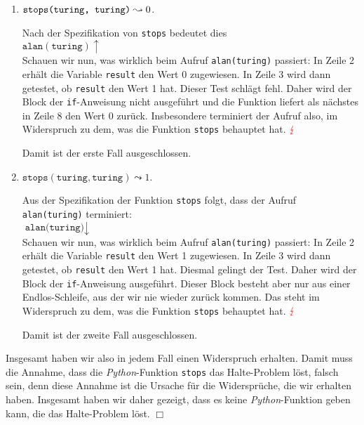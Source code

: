 \begin{enumerate}
\item $\texttt{stops(\texttt{turing}, \texttt{turing})} \leadsto 0$. 

      Nach der Spezifikation von \texttt{stops} bedeutet dies \\[0.1cm]
      \hspace*{1.3cm} $\texttt{alan}(\texttt{turing}) \uparrow$ \\[0.1cm]
      Schauen wir nun, was wirklich beim Aufruf \texttt{alan(turing)} passiert:
      In Zeile 2 erhält die Variable \texttt{result} den Wert 0 zugewiesen.  In Zeile 3
      wird dann getestet, ob \texttt{result} den Wert 1 hat.  Dieser Test schlägt fehl.
      Daher wird der Block der \texttt{if}-Anweisung nicht ausgeführt und die Funktion liefert als
      nächstes in Zeile 8 den Wert 0 zurück.  Insbesondere terminiert der Aufruf also, im
      Widerspruch zu dem, was die Funktion \texttt{stops} behauptet hat. ${\color{red}\lightning}$

      Damit ist der erste Fall ausgeschlossen.
\item  $\texttt{stops}(\texttt{turing}, \texttt{turing}) \leadsto 1$. 

      Aus der Spezifikation der Funktion \texttt{stops} folgt, dass der Aufruf
      \texttt{alan(turing)} terminiert: \\[0.1cm]
      \hspace*{1.3cm} $\texttt{alan(turing)} \downarrow$ \\[0.1cm]
      Schauen wir nun, was wirklich beim Aufruf \texttt{alan(turing)} passiert:
      In Zeile 2 erhält die Variable \texttt{result} den Wert 1 zugewiesen.  In Zeile 3
      wird dann getestet, ob \texttt{result} den Wert 1 hat.  Diesmal gelingt der Test.
      Daher wird der Block der \texttt{if}-Anweisung ausgeführt.  Dieser Block
      besteht aber nur aus einer Endlos-Schleife, aus der wir nie wieder zurück kommen.
      Das steht im Widerspruch zu dem, was die Funktion \texttt{stops} behauptet hat.
      ${\color{red}\lightning}$

      Damit ist der zweite Fall ausgeschlossen.
\end{enumerate}
Insgesamt haben wir also in jedem Fall einen Widerspruch erhalten.  
Damit muss die Annahme, dass die \textsl{Python}-Funktion \texttt{stops}
das Halte-Problem löst, falsch sein, denn diese Annahme ist die Ursache für die Widersprüche, die
wir erhalten haben.  Insgesamt haben wir daher gezeigt, dass es keine \textsl{Python}-Funktion
geben kann, die das Halte-Problem löst. \hspace*{\fill} $\Box$
\vspace*{0.3cm}

